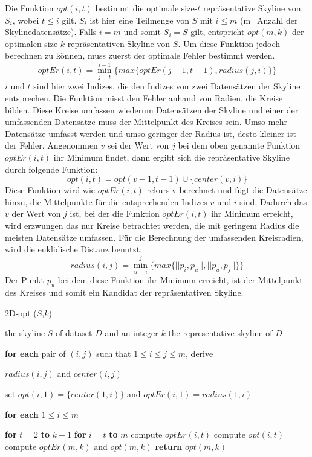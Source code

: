 Die Funktion $opt(i,t)$ bestimmt die optimale size-$t$ repräsentative Skyline von $S_i$, wobei $t \leq i$ gilt. $S_i$ ist hier eine Teilmenge von $S$ mit $i \leq m$ (m=Anzahl der Skylinedatensätze). Falls $i=m$ und somit $S_i=S$ gilt, entspricht $opt(m,k)$ der optimalen size-$k$ repräsentativen Skyline von $S$.
Um diese Funktion jedoch berechnen zu können, muss zuerst der optimale Fehler bestimmt werden.
$$optEr(i,t)=\min\limits_{j=t}^{i-1}\{max\{optEr(j-1,t-1),radius(j,i)\}\}$$
$i$ und $t$ sind hier zwei Indizes, die den Indizes von zwei Datensätzen der Skyline entsprechen. Die Funktion misst den Fehler anhand von Radien, die Kreise bilden. Diese Kreise umfassen wiederum Datensätzen der Skyline und einer der umfassenden Datensätze muss der Mittelpunkt des Kreises sein. Umso mehr Datensätze umfasst werden und umso geringer der Radius ist, desto kleiner ist der Fehler. 
Angenommen $v$ sei der Wert von $j$ bei dem oben genannte Funktion $optEr(i,t)$ ihr Minimum findet, dann ergibt sich die repräsentative Skyline durch folgende Funktion:
$$opt(i,t)=opt(v-1,t-1)\cup\{center(v,i)\}$$
Diese Funktion wird wie $optEr(i,t)$ rekursiv berechnet und fügt die Datensätze hinzu, die Mittelpunkte für die entsprechenden Indizes $v$ und $i$ sind. Dadurch das $v$ der Wert von $j$ ist, bei der die Funktion $optEr(i,t)$ ihr Minimum erreicht, wird erzwungen das nur Kreise betrachtet werden, die mit geringem Radius die meisten Datensätze umfassen.   
Für die Berechnung der umfassenden Kreisradien, wird die euklidische Distanz benutzt:
$$radius(i,j)=\min\limits_{u=i}^{j}\{max\{||p_i,p_u||,||p_u,p_j||\}\}$$
Der Punkt $p_u$ bei dem diese Funktion ihr Minimum erreicht, ist der Mittelpunkt des Kreises und somit ein Kandidat der repräsentativen Skyline.

\begin{algorithm}[H]
\caption{2D-opt ($S$,$k$)}\label{algo:2DOpt}
\begin{algorithmic}[1]
\INPUTBF the skyline $S$ of dataset $D$ and an integer $k$
\OUTPUTBF the representative skyline of $D$
\State \parbox[t]{\dimexpr\linewidth-\algorithmicindent}{\textbf{for each} pair of $(i,j)$ such that $1 \leq i \leq j \leq m$, derive\par 
$radius(i,j)$ and $center(i,j)$\strut}
\State \parbox[t]{\dimexpr\linewidth-\algorithmicindent}{set $opt(i,1) = \{center(1,i)\}$ and $optEr(i,1)=radius(1,i)$\par
\textbf{for each} $1 \leq i \leq m$\strut}
\State \textbf{for} $t=2$ \textbf{to} $k-1$
\State \hspace{\algorithmicindent} \textbf{for} $i=t$ \textbf{to} $m$
\State \hspace{\algorithmicindent}\hspace{\algorithmicindent} compute $optEr(i,t)$
\State \hspace{\algorithmicindent}\hspace{\algorithmicindent} compute $opt(i,t)$
\State compute $optEr(m,k)$ and $opt(m,k)$
\State \textbf{return} $opt(m,k)$
\end{algorithmic}
\end{algorithm}

